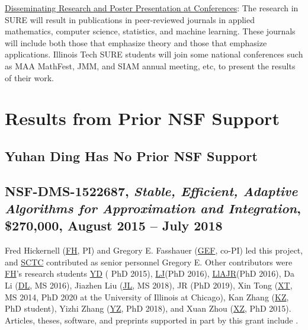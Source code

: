 \documentclass[11pt]{NSFamsart}
\newcommand{\Upara}[1]{\noindent\underline{\upshape #1}:}
\newcommand{\FH}{\hyperlink{FHlink}{FH}\xspace}
\newcommand{\SCTC}{\hyperlink{SCTClink}{SCTC}\xspace}
\newcommand{\GEF}{\hyperlink{GEFlink}{GEF}\xspace}
\newcommand{\YD}{\hyperlink{YDlink}{YD}\xspace}
\newcommand{\LlAJR}{\hyperlink{LlAJRlink}{LlAJR}\xspace}
\newcommand{\LJ}{\hyperlink{LJlink}{LJ}\xspace}
\newcommand{\XT}{\hyperlink{XTlink}{XT}\xspace}
\newcommand{\KZ}{\hyperlink{KZlink}{KZ}\xspace}
\newcommand{\DL}{\hyperlink{DLlink}{DL}\xspace}
\newcommand{\XZ}{\hyperlink{XZlink}{XZ}\xspace}
\newcommand{\JL}{\hyperlink{JLlink}{JL}\xspace}
\newcommand{\YZ}{\hyperlink{YZlink}{YZ}\xspace}
\begin{document}
\Upara{Disseminating Research and Poster Presentation at Conferences}
The research in SURE will result in publications in peer-reviewed journals in applied mathematics, computer science, statistics, and machine learning. These journals will include both those that emphasize theory and those that emphasize applications. Illinois Tech  SURE students will join some national conferences such as MAA MathFest, JMM, and SIAM annual meeting, etc, to present the results of their work.


\section{Results from Prior NSF Support} \label{sec:prior_work}

\subsection{Yuhan Ding Has No Prior NSF Support}

\subsection{NSF-DMS-1522687, \emph{Stable, Efficient, Adaptive Algorithms for
			Approximation and Integration},
		\$270,000, August 2015 -- July 2018} \label{sec:PreviousFred}
Fred Hickernell (\FH, PI) and Gregory E. Fasshauer (\GEF, co-PI) led this project, and \SCTC contributed as senior personnel
Gregory E.  Other contributors were \FH's research students {\YD} ( PhD 2015), \LJ (PhD 2016),
\LlAJR (PhD 2016), \hypertarget{DLlink}{Da Li} (\DL, MS 2016), \hypertarget{JLlink}{Jiazhen Liu} (\JL, MS 2018), JR (PhD 2019), \hypertarget{XTlink}{Xin Tong} (\XT, MS 2014, PhD 2020 at the University of Illinois at Chicago), \hypertarget{KZlink}{Kan Zhang} (\KZ, PhD student), \hypertarget{YZlink}{Yizhi Zhang} (\YZ, PhD 2018), and \hypertarget{XZlink}{Xuan Zhou} (\XZ, PhD 2015).  Articles, theses,
software, and preprints supported in
part by this
grant
include
\cite{ala_augmented_2017,
	ChoEtal17a,
	ChoEtal21a,
	Din15a,
	DinHic20a,
	GilEtal16a,
	Hic17a,
	HicJag18b,
	HicJim16a,
	HicEtal18a,
	HicEtal17a,
	HicKriWoz19a,
	RatHic19a,
	GilJim16b,
	JimHic16a,
	JohFasHic18a,
	Li16a,
	Liu17a,
	MarEtal18a,
	mccourt_stable_2017,
	MCCEtal19a,
	mishra_hybrid_2018,
	MisEtal19a,
	rashidinia_stable_2016,
	rashidinia_stable_2018,
	Zha18a,
	Zha17a,
	Zho15a,
	ZhoHic15a}.
\end{document}
